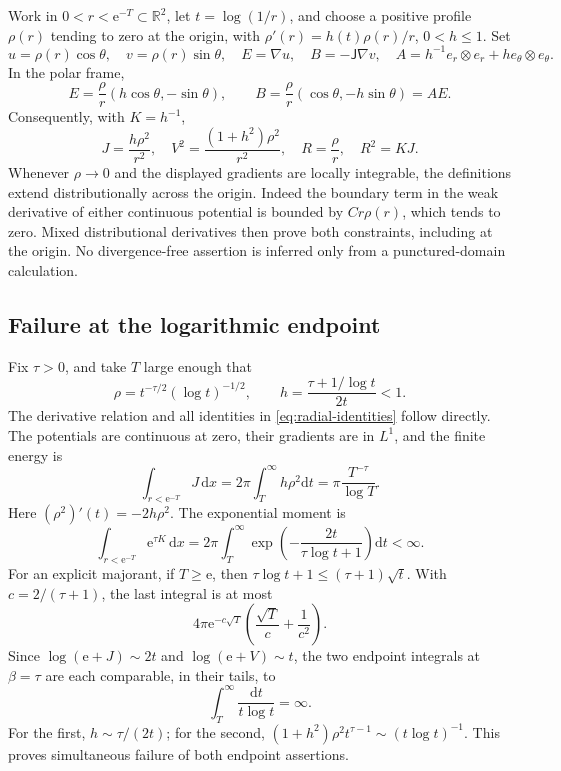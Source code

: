 \documentclass[11pt,a4paper]{article}
\numberwithin{equation}{section}
\theoremstyle{definition}
\theoremstyle{remark}\newtheorem{remark}[theorem]{Remark}
\newcommand{\R}{\mathbb R}
\newcommand{\ee}{\mathrm e}
\newcommand{\dd}{\,\mathrm dx}
\newcommand{\Rot}{\mathsf J}
\begin{document}
Work in \(0<r<\ee^{-T}\subset\R^2\), let \(t=\log(1/r)\), and choose
a positive profile \(\rho(r)\) tending to zero at the origin, with
\(\rho'(r)=h(t)\rho(r)/r\), \(0<h\leq1\).
Set
\begin{equation}\label{eq:radial-pair}
 u=\rho(r)\cos\theta,\quad v=\rho(r)\sin\theta,\quad
 E=\nabla u,\quad B=-\Rot\nabla v,\quad
 A=h^{-1}e_r\otimes e_r+h e_\theta\otimes e_\theta.
\end{equation}
In the polar frame,
\[
 E=\frac\rho r(h\cos\theta,-\sin\theta),\qquad
 B=\frac\rho r(\cos\theta,-h\sin\theta)=AE.
\]
Consequently, with \(K=h^{-1}\),
\begin{equation}\label{eq:radial-identities}
 J=\frac{h\rho^2}{r^2},\quad
 V^2=\frac{(1+h^2)\rho^2}{r^2},\quad
 R=\frac\rho r,\quad R^2=KJ.
\end{equation}
Whenever \(\rho\to0\) and the displayed gradients are locally integrable,
the definitions extend distributionally across the origin.
Indeed the boundary term in the weak derivative of either continuous
potential is bounded by \(C r\rho(r)\), which tends to zero.
Mixed distributional derivatives then prove both constraints, including
at the origin. No divergence-free assertion is inferred only from a
punctured-domain calculation.

\subsection{Failure at the logarithmic endpoint}

Fix \(\tau>0\), and take \(T\) large enough that
\[
 \rho=t^{-\tau/2}(\log t)^{-1/2},\qquad
 h=\frac{\tau+1/\log t}{2t}<1.
\]
The derivative relation and all identities in
\eqref{eq:radial-identities} follow directly.
The potentials are continuous at zero, their gradients are in \(L^1\),
and the finite energy is
\begin{equation}\label{eq:radial-energy}
 \int_{r<\ee^{-T}}J\dd
 =2\pi\int_T^\infty h\rho^2\mathrm dt
 =\pi\frac{T^{-\tau}}{\log T}.
\end{equation}
Here \((\rho^2)'(t)=-2h\rho^2\).
The exponential moment is
\begin{equation}\label{eq:radial-exp}
 \int_{r<\ee^{-T}}\ee^{\tau K}\dd
 =2\pi\int_T^\infty
          \exp\left(-\frac{2t}{\tau\log t+1}\right)\mathrm dt<\infty.
\end{equation}
For an explicit majorant, if \(T\geq\ee\), then
\(\tau\log t+1\leq(\tau+1)\sqrt t\).
With \(c=2/(\tau+1)\), the last integral is at most
\[
 4\pi\ee^{-c\sqrt T}
                  \left(\frac{\sqrt T}{c}+\frac1{c^2}\right).
\]
Since \(\log(\ee+J)\sim2t\) and \(\log(\ee+V)\sim t\),
the two endpoint integrals at \(\beta=\tau\) are each comparable,
in their tails, to
\[
 \int_T^\infty\frac{\mathrm dt}{t\log t}=\infty.
\]
For the first, \(h\sim\tau/(2t)\); for the second,
\((1+h^2)\rho^2t^{\tau-1}\sim(t\log t)^{-1}\).
This proves simultaneous failure of both endpoint assertions.
\end{document}
